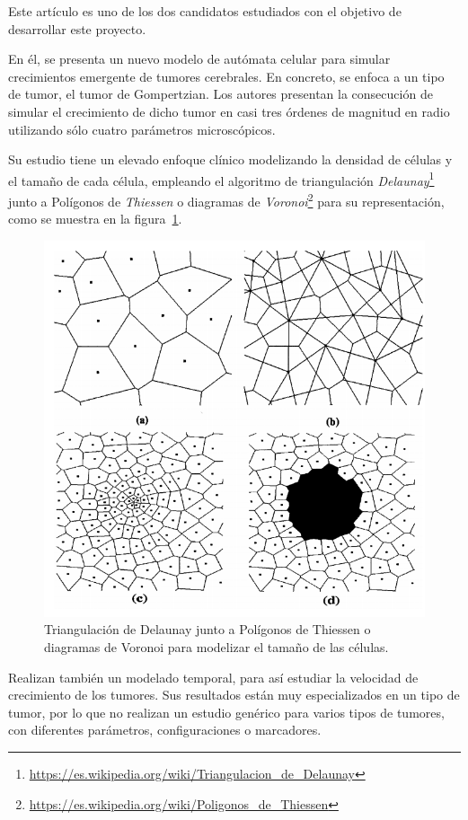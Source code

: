 Este artículo \cite{kansal-torquato} es uno de los dos candidatos estudiados con el objetivo
de desarrollar este proyecto.

En él, se presenta un nuevo modelo de autómata celular para simular crecimientos emergente de tumores cerebrales.
En concreto, se enfoca a un tipo de tumor, el tumor de Gompertzian. Los autores presentan
la consecución de simular el crecimiento de dicho tumor en casi tres órdenes de magnitud en radio
utilizando sólo cuatro parámetros microscópicos.

Su estudio tiene un elevado enfoque clínico modelizando la densidad de células y
el tamaño de cada célula, empleando el algoritmo de triangulación \textit{Delaunay}\footnote{\url{https://es.wikipedia.org/wiki/Triangulacion_de_Delaunay}}
junto a Polígonos de \textit{Thiessen} o diagramas de \textit{Voronoi}\footnote{\url{https://es.wikipedia.org/wiki/Poligonos_de_Thiessen}} para su representación,
como se muestra en la figura~\ref{fig:delaunay}.

\begin{figure}[h]
\centering
\includegraphics[scale=0.7]{figures/modelado_tamanio}
\caption{Triangulación de Delaunay junto a Polígonos de Thiessen o diagramas de Voronoi para modelizar el tamaño de las células.}
\label{fig:delaunay}
\end{figure}

\newpage

Realizan también un modelado temporal, para así estudiar la velocidad de crecimiento de los tumores.
Sus resultados están muy especializados en un tipo de tumor, por lo que no realizan un estudio genérico
para varios tipos de tumores, con diferentes parámetros, configuraciones o marcadores.
